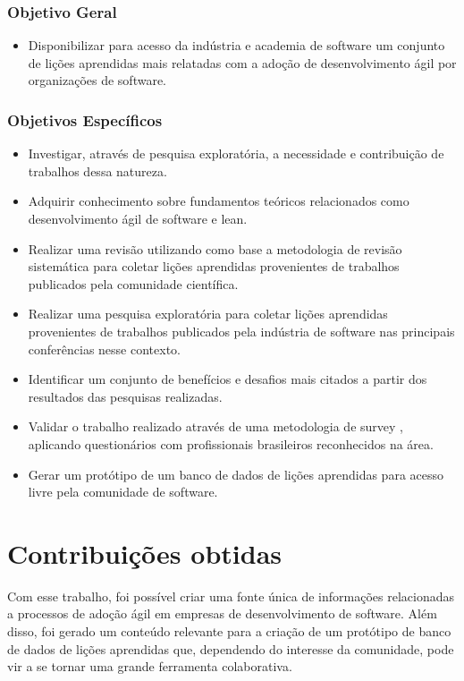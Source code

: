 \subsubsection{Objetivo Geral}

\begin{itemize}
	\item Disponibilizar para acesso da indústria e academia de software um conjunto de lições aprendidas mais relatadas com a adoção de desenvolvimento ágil por organizações de software.
\end{itemize}

\subsubsection{Objetivos Específicos}

\begin{itemize}
	\item Investigar, através de pesquisa exploratória, a necessidade e contribuição de trabalhos dessa natureza.
	\item Adquirir conhecimento sobre fundamentos teóricos relacionados como desenvolvimento ágil de software e lean.
	\item Realizar uma revisão utilizando como base a metodologia de revisão sistemática \cite{Barbara04} para coletar lições aprendidas provenientes de trabalhos publicados pela comunidade científica.
	\item Realizar uma pesquisa exploratória para coletar lições aprendidas provenientes de trabalhos publicados pela indústria de software nas principais conferências nesse contexto.
	\item Identificar um conjunto de benefícios e desafios mais citados a partir dos resultados das pesquisas realizadas.
	\item Validar o trabalho realizado através de uma metodologia de survey \cite{Babbie1990}, aplicando questionários com profissionais brasileiros reconhecidos na área.
	\item Gerar um protótipo de um banco de dados de lições aprendidas para acesso livre pela comunidade de software.
\end{itemize}

\section{Contribuições obtidas}

Com esse trabalho, foi possível criar uma fonte única de informações relacionadas a processos de adoção ágil em empresas de desenvolvimento de software. Além disso, foi gerado um conteúdo relevante para a criação de um protótipo de banco de dados de lições aprendidas que, dependendo do interesse da comunidade, pode vir a se tornar uma grande ferramenta colaborativa.

